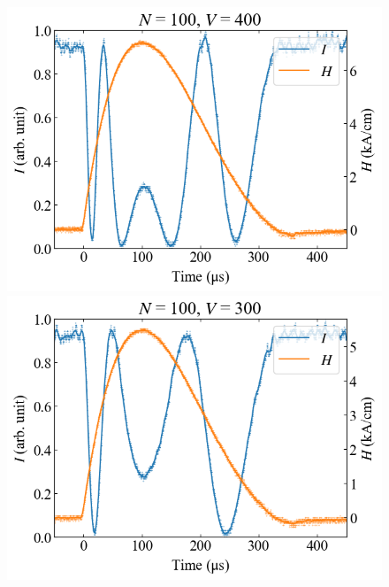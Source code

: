 \documentclass[9pt,dvipdfmx,a4paper]{jsarticle}
\begin{document}
\begin{figure}[H]
    \centering
    \begin{minipage}[t]{0.24\columnwidth}
        \centering
        \includegraphics[width = \columnwidth]{xt/05.png}
    \end{minipage}
    \hfill
    \begin{minipage}[t]{0.24\columnwidth}
        \centering
        \includegraphics[width = \columnwidth]{xt/06.png}
    \end{minipage}
    \hfill
    \begin{minipage}[t]{0.24\columnwidth}
        \centering

\end{minipage}
\end{figure}
\end{document}
